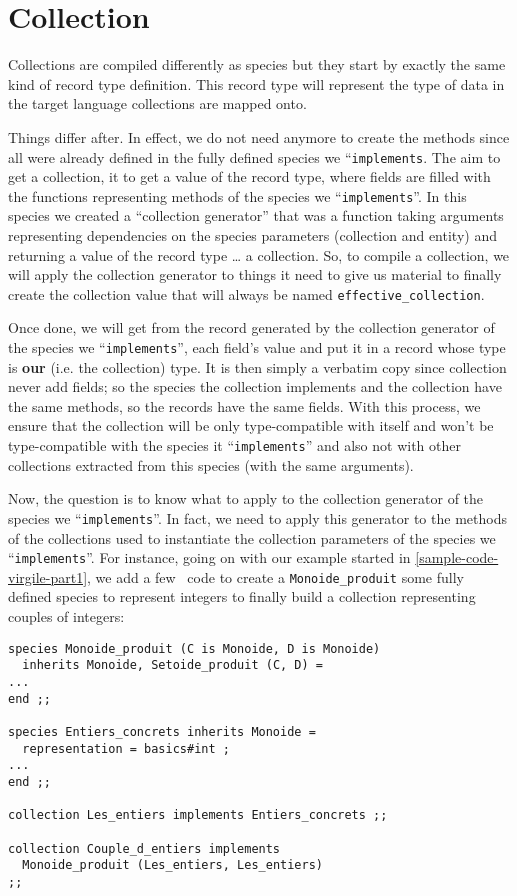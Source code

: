 \section{Collection}
Collections are compiled differently as species but they start by
exactly the same kind of record type definition. This record type will
represent the type of data in the target language collections are
mapped onto.

Things differ after. In effect, we do not need anymore to create the
methods since all were already defined in the fully defined species we
``{\tt implements}. The aim to get a collection, it to get a value of
the record type, where fields are filled with the functions
representing methods of the species we ``{\tt implements}''. In this
species we created a ``collection generator'' that was a function
taking arguments representing dependencies on the species parameters
(collection and entity) and returning a value of the record type \ldots
a collection. So, to compile a collection, we will apply the
collection generator to things it need to give us material to finally
create the collection value that will always be named
{\tt effective\_collection}.

Once done, we will get from the record generated by the collection
generator of the species we ``{\tt implements}'', each field's value
and put it in a record whose type is {\bf our} (i.e. the collection)
type. It is then simply a verbatim copy since collection never add
fields; so the species the collection implements and the collection
have the same methods, so the records have the same fields. With this
process, we ensure that the collection will be only type-compatible
with itself and won't be type-compatible with the species it
``{\tt implements}'' and also not with other collections extracted
from this species (with the same arguments).

Now, the question is to know what to apply to the collection generator
of the species we ``{\tt implements}''. In fact, we need to apply this
generator to the methods of the collections used to instantiate the
collection parameters of the species we ``{\tt implements}''.
For instance, going on with our example started in
\ref{sample-code-virgile-part1}, we add a few \focalize\ code to
create a {\tt Monoide\_produit} some fully defined species to
represent integers to finally build a collection representing couples
of integers:

{\footnotesize
\begin{lstlisting}[title=More \focalize\ code to create collections]
species Monoide_produit (C is Monoide, D is Monoide)
  inherits Monoide, Setoide_produit (C, D) =
...
end ;;

species Entiers_concrets inherits Monoide =
  representation = basics#int ;
...
end ;;

collection Les_entiers implements Entiers_concrets ;;

collection Couple_d_entiers implements
  Monoide_produit (Les_entiers, Les_entiers)
;;
\end{lstlisting}}

